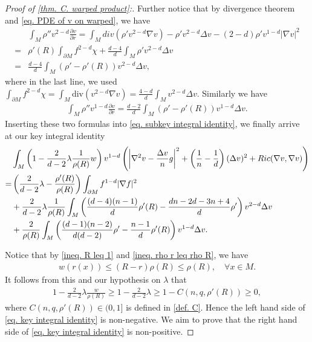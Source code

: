 \documentclass[12pt]{amsart}%
\numberwithin{equation}{section}
\numberwithin{lemma}{section}
\numberwithin{proposition}{section}
\numberwithin{corollary}{section}
\numberwithin{remark}{section}
\begin{document}
\begin{proof}[Proof of \cref{thm. C. warped product}:]
    Further notice that by divergence theorem and \cref{eq. PDE of v on warped}, we have
    \begin{align*}
            &\int_M \rho'' v^{2-d}\frac{\partial v}{\partial r}
            =\int_M div\left(\rho'v^{2-d}\nabla v\right)
            -\rho' v^{2-d}\Delta v-(2-d)\rho'v^{1-d}|\nabla v|^2\\
            =&\rho'(R)\int_{\partial M}f^{2-d}\chi
            +\frac{d-4}{d}\int_M \rho'v^{2-d}\Delta v\\
            =&\frac{d-4}{d}\int_M \left(\rho'-\rho'(R)\right)v^{2-d}\Delta v,
    \end{align*}
    where in the last line, we used $\int_{\partial M}f^{2-d}\chi
        =\int_{M}\mathrm{div}(v^{2-d}\nabla v)
        =\frac{4-d}{d}\int_{M}v^{2-d}\Delta v$.
    Similarly we have
    \begin{align}\label{eq. integral trick}
        \int_M \rho'' v^{1-d}\frac{\partial v}{\partial r}
            =\frac{d-2}{d}\int_M (\rho'-\rho'(R))v^{1-d}\Delta v.
    \end{align}
    Inserting these two formulas into \cref{eq. subkey integral identity}, we finally arrive at our key integral identity
    \begin{align}\label{eq. key integral identity}
        &\int_M \left(1-\frac{2}{d-2}\lambda\frac{1}{\rho(R)}w\right)
        v^{1-d}\left(
        \left|\nabla^2v-\frac{\Delta v}{n}g\right|^2
        +\left(\frac{1}{n}-\frac{1}{d}\right)(\Delta v)^2
        +Ric(\nabla v,\nabla v)
        \right)\notag\\
        =&\left(\frac{2}{d-2}\lambda-\frac{\rho'(R)}{\rho(R)}\right)\int_{\partial M}f^{1-d}|\nabla f|^2\notag\\
        &
        +\frac{2}{d-2}\lambda\frac{1}{\rho(R)}
        \int_M
        \left(
        \frac{(d-4)(n-1)}{d}\rho'(R)-\frac{dn-2d-3n+4}{d}\rho'
        \right)
         v^{2-d}\Delta v\notag
        \\
        &+\frac{2}{\rho(R)}\int_M 
        \left(\frac{(d-1)(n-2)}{d(d-2)}\rho'
        -\frac{n-1}{d}\rho'(R)
        \right)
        v^{1-d}\Delta v.
    \end{align}

    Notice that by \cref{ineq. R leq 1} and \cref{ineq. rho r leq rho R}, we have
    \begin{align*}
        w(r(x))\leq (R-r)\rho(R)\leq \rho(R),\quad
        \forall x\in M.
    \end{align*}
    It follows from this and our hypothesis on $\lambda$ that 
    \begin{align*}
        1-\frac{2}{d-2}\lambda \frac{w}{\rho(R)}
    \geq1-\frac{2}{d-2}\lambda
    \geq 1-C(n,q,\rho'(R))\geq 0,
    \end{align*}
    where $C(n,q,\rho'(R))\in(0,1]$ is defined in \cref{def. C}.
    Hence the left hand side of \cref{eq. key integral identity} is non-negative. We aim to prove that the right hand side of \cref{eq. key integral identity} is non-positive.
    

\end{proof}
\end{document}

